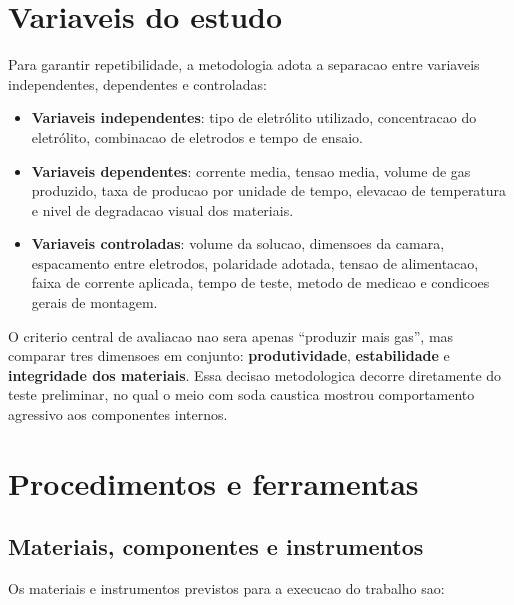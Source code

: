\documentclass[12pt,oneside,a4paper,brazilian]{abntex2}
\begin{document}
\section{Variaveis do estudo}

Para garantir repetibilidade, a metodologia adota a separacao entre variaveis independentes, dependentes e controladas:

\begin{itemize}
  \item \textbf{Variaveis independentes}: tipo de eletrólito utilizado, concentracao do eletrólito, combinacao de eletrodos e tempo de ensaio.
  \item \textbf{Variaveis dependentes}: corrente media, tensao media, volume de gas produzido, taxa de producao por unidade de tempo, elevacao de temperatura e nivel de degradacao visual dos materiais.
  \item \textbf{Variaveis controladas}: volume da solucao, dimensoes da camara, espacamento entre eletrodos, polaridade adotada, tensao de alimentacao, faixa de corrente aplicada, tempo de teste, metodo de medicao e condicoes gerais de montagem.
\end{itemize}

O criterio central de avaliacao nao sera apenas ``produzir mais gas'', mas comparar tres dimensoes em conjunto: \textbf{produtividade}, \textbf{estabilidade} e \textbf{integridade dos materiais}. Essa decisao metodologica decorre diretamente do teste preliminar, no qual o meio com soda caustica mostrou comportamento agressivo aos componentes internos.

\section{Procedimentos e ferramentas}

\subsection{Materiais, componentes e instrumentos}

Os materiais e instrumentos previstos para a execucao do trabalho sao:
\end{document}
